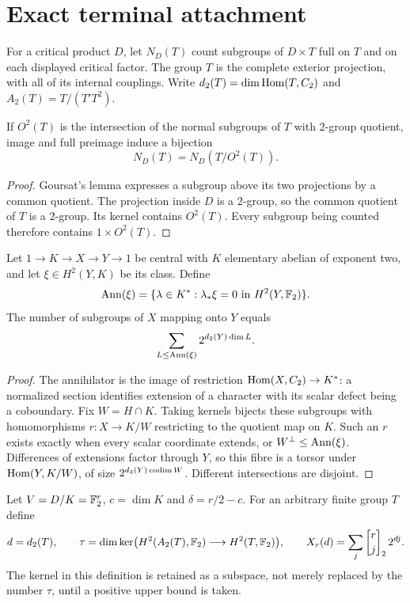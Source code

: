 \section{Exact terminal attachment}\label{sec:terminal}
For a critical product $D$, let $N_D(T)$ count subgroups of $D\times T$
full on $T$ and on each displayed critical factor. The group $T$ is
the complete exterior projection, with all of its internal couplings.
Write $d_2(T)=\dim\operatorname{Hom}(T,C_2)$ and
$A_2(T)=T/(T'T^2)$.

\begin{lemma}\label{lem:contraction}
If $O^2(T)$ is the intersection of the normal subgroups of $T$ with
$2$-group quotient, image and full preimage induce a bijection
\[
 N_D(T)=N_D(T/O^2(T)).
\]
\end{lemma}
\begin{proof}
Goursat's lemma expresses a subgroup above its two projections by a
common quotient. The projection inside $D$ is a $2$-group, so the common
quotient of $T$ is a $2$-group. Its kernel contains $O^2(T)$.
Every subgroup being counted therefore contains $1\times O^2(T)$.
\end{proof}

\begin{lemma}\label{lem:central-fibre}
Let $1\to K\to X\to Y\to1$ be central with $K$ elementary abelian
of exponent two, and let $\xi\in H^2(Y,K)$ be its class. Define
\[
 \operatorname{Ann}(\xi)=\{\lambda\in K^*: \lambda_*\xi=0\text{ in }H^2(Y,\mathbb F_2)\}.
\]
The number of subgroups of $X$ mapping onto $Y$ equals
\begin{equation}\label{eq:central-fibre}
 \sum_{L\leq\operatorname{Ann}(\xi)}2^{d_2(Y)\dim L}.
\end{equation}
\end{lemma}
\begin{proof}
The annihilator is the image of restriction $\operatorname{Hom}(X,C_2)\to K^*$:
a normalized section identifies extension of a character with its scalar
defect being a coboundary. Fix $W=H\cap K$. Taking kernels bijects these
subgroups with homomorphisms $r:X\to K/W$ restricting to the quotient
map on $K$. Such an $r$ exists exactly when every scalar coordinate extends,
or $W^\perp\leq\operatorname{Ann}(\xi)$. Differences of extensions factor through $Y$,
so this fibre is a torsor under $\operatorname{Hom}(Y,K/W)$, of size
$2^{d_2(Y)\operatorname{codim} W}$. Different intersections are disjoint.
\end{proof}

Let $V=D/K=\mathbb F_2^r$, $c=\dim K$ and $\delta=r/2-c$. For an arbitrary
finite group $T$ define
\begin{equation}\label{eq:tau}
 d=d_2(T),\qquad
 \tau=\dim\ker\bigl(H^2(A_2(T),\F_2)\longrightarrow H^2(T,\F_2)\bigr),
 \qquad X_r(d)=\sum_j\gauss rj2\,2^{dj}.
\end{equation}
The kernel in this definition is retained as a subspace, not merely
replaced by the number $\tau$, until a positive upper bound is taken.

